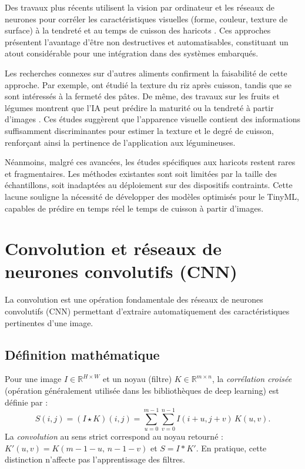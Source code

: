 Des travaux plus récents utilisent la vision par ordinateur et les réseaux de neurones pour corréler les caractéristiques visuelles (forme, couleur, texture de surface) à la tendreté et au temps de cuisson des haricots \cite{njoroge2021}. Ces approches présentent l’avantage d’être non destructives et automatisables, constituant un atout considérable pour une intégration dans des systèmes embarqués.

Les recherches connexes sur d’autres aliments confirment la faisabilité de cette approche. Par exemple, \cite{patindol2017} ont étudié la texture du riz après cuisson, tandis que \cite{foschia2015} se sont intéressés à la fermeté des pâtes. De même, des travaux sur les fruits et légumes montrent que l’IA peut prédire la maturité ou la tendreté à partir d’images \cite{kaur2020}. Ces études suggèrent que l’apparence visuelle contient des informations suffisamment discriminantes pour estimer la texture et le degré de cuisson, renforçant ainsi la pertinence de l’application aux légumineuses.

Néanmoins, malgré ces avancées, les études spécifiques aux haricots restent rares et fragmentaires. Les méthodes existantes sont soit limitées par la taille des échantillons, soit inadaptées au déploiement sur des dispositifs contraints. Cette lacune souligne la nécessité de développer des modèles optimisés pour le TinyML, capables de prédire en temps réel le temps de cuisson à partir d’images.

\section{Convolution et réseaux de neurones convolutifs (CNN)}
\label{sec:cnn}
La convolution est une opération fondamentale des réseaux de neurones convolutifs (CNN) permettant d’extraire automatiquement des caractéristiques pertinentes d’une image.

\subsection{Définition mathématique}
Pour une image $I \in \mathbb{R}^{H\times W}$ et un noyau (filtre) $K \in \mathbb{R}^{m\times n}$, la \emph{corrélation croisée} (opération généralement utilisée dans les bibliothèques de deep learning) est définie par :
\begin{equation}
    \label{eq:xcorr}
    S(i,j) = (I \star K)(i,j) = \sum_{u=0}^{m-1} \sum_{v=0}^{n-1} I(i+u, j+v)\, K(u,v).
\end{equation}
La \emph{convolution} au sens strict correspond au noyau retourné : $K'(u,v) = K(m{-}1{-}u,\,n{-}1{-}v)$ et $S = I \ast K'$. En pratique, cette distinction n’affecte pas l’apprentissage des filtres.

